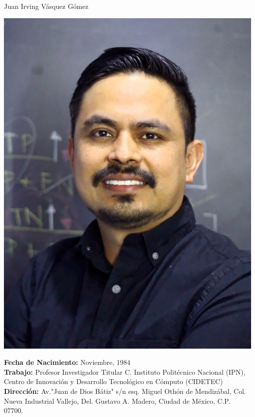 \documentclass[10pt]{article}
\begin{document}
\begin{center}
{\huge Juan Irving Vásquez Gómez}
\vspace{0.5cm}


\begin{minipage}[b]{0.30\linewidth}
	\centering
\includegraphics[width=\textwidth]{jivg_foto2}
\end{minipage}
\hspace{0.5cm}
\begin{minipage}[b]{0.65\linewidth}
\textbf{Fecha de Nacimiento:} Noviembre, 1984 \\
\textbf{Trabajo:} Profesor Investigador Titular C. Instituto Politécnico Nacional (IPN), Centro de Innovación y Desarrollo Tecnológico en Cómputo (CIDETEC) \href{https://www.cidetec.ipn.mx/}{\faExternalLink} \\ 
\textbf{Dirección:} Av."Juan de Dios Bátiz" s/n esq. Miguel Othón de Mendizábal, 
Col. Nueva Industrial Vallejo, Del. Gustavo A. Madero, Ciudad de México, C.P. 07700. \\

\end{minipage}
\end{center}
\end{document}
